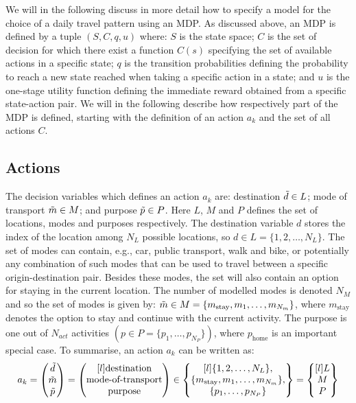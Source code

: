 \newcommand{\s}[1]{s_{#1}}
We will in the following discuss in more detail how to specify a model for the choice of a daily travel pattern using an MDP. As discussed above, an MDP is defined by a tuple $(S,C,q,u)$ where: $S$ is the state space; $C$ is the set of decision for which there exist a function $C(s)$ specifying the set of available actions in a specific state; $q$ is the transition probabilities defining the probability to reach a new state reached when taking a specific action in a state; and $u$ is the one-stage utility function defining the immediate reward obtained from a specific state-action pair. We will in the following describe how respectively part of the MDP is defined, starting with the definition of an action $a_k$ and the set of all actions $C$.
\subsection{Actions}
The decision variables which defines an action $a_k$ are: destination $\tilde{d} \in L$; mode of transport $\tilde{m} \in M$; and purpose $\tilde{p} \in P$. Here $L$, $M$ and $P$ defines the set of locations, modes and purposes respectively.  The destination variable $d$ stores the index of the location among $N_L$ possible locations, so $d \in  L = \{1,2,\dots, N_L\}$. The set of modes can contain, e.g., car, public transport, walk and bike, or potentially any combination of such modes that can be used to travel between a specific origin-destination pair. Besides these modes, the set will also contain an option for staying in the current location. The number of modelled modes is denoted $N_M$ and so the set of modes is given by: $\tilde{m} \in M = \{m_{\text{stay}},m_1,\dots,m_{N_m}\}$, where $m_{\text{stay}}$ denotes the option to stay and continue with the current activity. The purpose is one out of  $N_{act}$ activities $(p\in P = \{p_1,\dots,p_{N_P}\})$, where $p_\text{home}$ is an important special case.
To summarise, an action $a_k$ can be written as: 
\begin{equation} 
    a_k = \begin{pmatrix}
    \act{d} \\
    \act{m} \\
    \act{p}    
    \end{pmatrix} =
    \begin{pmatrix*}[l]
    \text{destination} \\
    \text{mode-of-transport} \\
    \text{purpose} \\
    \end{pmatrix*} 
    \in
    \begin{Bmatrix*}[l]
    \{1,2,\dots, N_L\}, \\
    \{m_{\text{stay}},m_1,\dots,m_{N_m}\}, \\
    \{p_1,\dots,p_{N_P}\} 
    \end{Bmatrix*}=
    \begin{Bmatrix*}[l]
    L \\
    M \\
    P \\
    \end{Bmatrix*}
\end{equation}
